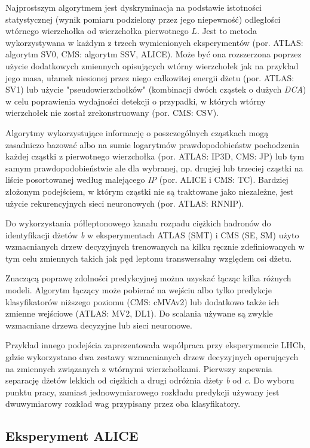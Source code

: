 Najprostszym algorytmem jest dyskryminacja na podstawie istotności statystycznej (wynik pomiaru podzielony przez jego niepewność) odległości wtórnego wierzchołka od wierzchołka pierwotnego $L$. Jest to metoda wykorzystywana w  każdym z trzech wymienionych eksperymentów (por. ATLAS: algorytm SV0, CMS: algorytm SSV, ALICE). 
Może być ona rozszerzona poprzez użycie dodatkowych zmiennych opisujących wtórny wierzchołek jak na przykład jego masa, ułamek niesionej przez niego całkowitej energii dżetu (por. ATLAS: SV1) lub użycie "pseudowierzchołków" (kombinacji dwóch cząstek o dużych \textit{DCA}) w celu poprawienia wydajności detekcji o przypadki, w których wtórny wierzchołek nie został zrekonstruowany (por. CMS: CSV).

Algorytmy wykorzystujące informację o poszczególnych cząstkach mogą zasadniczo bazować albo na sumie logarytmów prawdopodobieństw pochodzenia każdej cząstki z pierwotnego wierzchołka (por. ATLAS: IP3D, CMS: JP) lub tym samym prawdopodobieństwie ale dla wybranej, np. drugiej lub trzeciej cząstki na liście posortowanej według malejącego \textit{IP} (por. ALICE i CMS: TC). Bardziej złożonym podejściem, w którym cząstki nie są traktowane jako niezależne, jest użycie rekurencyjnych sieci neuronowych (por. ATLAS: RNNIP).

Do wykorzystania półleptonowego kanału rozpadu ciężkich hadronów do identyfikacji dżetów \textit{b} w eksperymentach ATLAS (SMT) i CMS (SE, SM) użyto wzmacnianych drzew decyzyjnych trenowanych na kilku ręcznie zdefiniowanych w tym celu zmiennych takich jak pęd leptonu transwersalny względem osi dżetu.

Znaczącą poprawę zdolności predykcyjnej można uzyskać łącząc kilka różnych modeli. 
Algorytm łączący może pobierać na wejściu albo tylko predykcje klasyfikatorów niższego poziomu (CMS: cMVAv2) lub dodatkowo także ich zmienne wejściowe (ATLAS: MV2, DL1). Do scalania używane są zwykle wzmacniane drzewa decyzyjne lub sieci neuronowe.

Przykład innego podejścia zaprezentowała współpraca przy eksperymencie LHCb, gdzie wykorzystano dwa zestawy wzmacnianych drzew decyzyjnych operujących na zmiennych związanych z wtórnymi wierzchołkami. Pierwszy zapewnia separację dżetów lekkich od ciężkich a drugi odróżnia dżety \textit{b} od \textit{c}. 
Do wyboru punktu pracy, zamiast jednowymiarowego rozkładu predykcji używany jest dwuwymiarowy rozkład wag przypisany przez oba klasyfikatory.

\clearpage

\subsection{Eksperyment ALICE}

